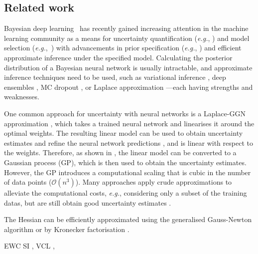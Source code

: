 \documentclass{article}
\makeatletter
\newcommand{\eg}{\textit{e.g.\@}\xspace}
\makeatother
\begin{document}
\subsection{Related work}
\label{sec:related}
%
Bayesian deep learning~\cite{Wilson:ensembles,neal1995bayesian} has recently gained increasing attention in the machine learning community as a means for uncertainty quantification (\eg, \cite{kendall2017what,wilson2020bayes}) and model selection (\eg,~\cite{immer2021marginal,antoran2022marginal}) with advancements in prior specification (\eg, \cite{meronen2020stationary,meronen2021periodic,fortuin2021bayesian,nalisnick2018do}) and efficient approximate inference under the specified model.
Calculating the posterior distribution of a Bayesian neural network is usually intractable, and approximate inference techniques need to be used, such as variational inference \cite{blei2017variational}, deep ensembles \cite{lakshminarayanan2017simple}, MC dropout \cite{gal2016dropout}, or Laplace approximation \cite{ritter2018kfac,kristiadi2020being,immer2021improving}---each having strengths and weaknesses. %

One common approach for uncertainty with neural networks is a Laplace-GGN approximation \citep{daxberger2021laplace}, which takes a trained neural network and linearises it around the optimal weights. The resulting linear model can be used to obtain uncertainty estimates and refine the neural network predictions \citep{immerScalable2021}, and is linear with respect to the weights. Therefore, as shown in \citep{immerScalable2021, khan2019approximate}, the linear model can be converted to a Gaussian process (GP), which is then used to obtain the uncertainty estimates.
However, the GP introduces a computational scaling that is cubic in the number of data points ($\mathcal{O}(n^3)$). Many approaches apply crude approximations to alleviate the computational costs, \eg, considering only a subset of the training datas, but are still obtain good uncertainty estimates \citep{immerScalable2021}. 

The Hessian can be efficiently approximated using the generalised Gauss-Newton algorithm \cite{botev2017practical} or by Kronecker factorisation \cite{martens2015optimizing,ritter2018kfac}.


EWC \cite{kirkpatrick2017overcoming}
SI \cite{zenke17a}, 
VCL \cite{nguyen-tuongModel2009},  
\end{document}

